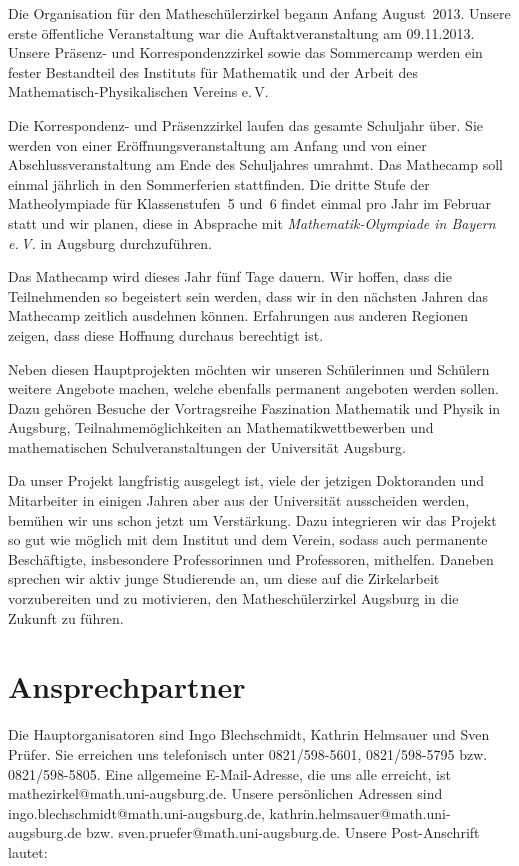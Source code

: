 \documentclass[12pt]{zettel}
\begin{document}
Die Organisation für den Matheschülerzirkel begann Anfang August~2013. Unsere
erste öffentliche Veranstaltung war die Auftaktveranstaltung am 09.11.2013.
Unsere Präsenz- und Korrespondenzzirkel sowie
das Sommercamp werden ein fester Bestandteil des Instituts für Mathematik und
der Arbeit des Mathematisch-Physikalischen Vereins e.\,V.

Die Korrespondenz- und Präsenzzirkel laufen
das gesamte Schuljahr über. Sie werden von einer
Eröffnungsveranstaltung am Anfang und von einer
Abschlussveranstaltung am Ende des Schuljahres umrahmt. Das Mathecamp soll
einmal jährlich in den Sommerferien stattfinden. Die dritte Stufe der
Matheolympiade für Klassenstufen~5 und~6 findet einmal pro Jahr
im Februar statt und wir planen, diese in
Absprache mit \emph{Mathematik-Olympiade in Bayern e.\,V.} in Augsburg
durchzuführen.

Das Mathecamp wird dieses Jahr fünf Tage dauern. Wir hoffen, dass die
Teilnehmenden so begeistert sein werden,
dass wir in den nächsten Jahren das
Mathecamp zeitlich ausdehnen können. Erfahrungen aus
anderen Regionen zeigen, dass diese Hoffnung durchaus berechtigt ist.

Neben diesen Hauptprojekten möchten wir unseren Schülerinnen und
Schülern weitere Angebote machen, welche ebenfalls permanent angeboten
werden sollen. Dazu gehören Besuche der Vortragsreihe Faszination
Mathematik und Physik in Augsburg, Teilnahmemöglichkeiten
an Mathematikwettbewerben und mathematischen Schulveranstaltungen der Universität Augsburg.

Da unser Projekt langfristig ausgelegt ist, viele der jetzigen Doktoranden und
Mitarbeiter in einigen Jahren aber aus der Universität ausscheiden werden,
bemühen wir uns schon jetzt um Verstärkung.
Dazu integrieren wir das Projekt so gut wie möglich mit
dem Institut und dem Verein, sodass auch permanente Beschäftigte,
insbesondere Professorinnen und Professoren, mithelfen. Daneben sprechen wir
aktiv junge Studierende an, um diese auf die Zirkelarbeit
vorzubereiten und zu motivieren, den Matheschülerzirkel
Augsburg in die Zukunft zu führen.


\section{Ansprechpartner}

Die Hauptorganisatoren sind Ingo Blechschmidt, Kathrin Helmsauer und Sven
Prüfer. Sie erreichen uns telefonisch unter 0821/598-5601, 0821/598-5795 bzw.
0821/598-5805. Eine allgemeine E-Mail-Adresse, die uns alle erreicht, ist
\textsf{mathezirkel@math.uni-augsburg.de}. Unsere persönlichen Adressen sind
\textsf{ingo.blechschmidt@math.uni-augsburg.de},
\textsf{kathrin.helmsauer@math.uni-augsburg.de} bzw.
\textsf{sven.pruefer@math.uni-augsburg.de}. Unsere Post-Anschrift lautet:
\end{document}
